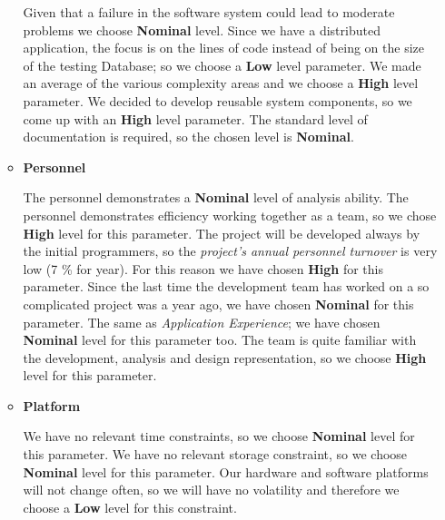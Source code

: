 \begin{itemize}
\begin{itemize}
		\begin{itemize}
			 Given that a failure in the software system could lead to moderate problems we choose \textbf{Nominal} level.
			 Since we have a distributed application, the focus is on the lines of code instead of being on the size of the testing Database; so we choose a \textbf{Low} level parameter.
			 We made an average of the various complexity areas and we choose a \textbf{High} level parameter.
			 We decided to develop reusable system components, so we come up with an \textbf{High} level parameter.
			 The standard level of documentation is required, so the chosen level is \textbf{Nominal}.
		\end{itemize}
		\item \textbf{Personnel}
		\begin{itemize}
			 The personnel demonstrates a \textbf{Nominal} level of analysis ability.
			 The personnel demonstrates efficiency working together as a team, so we chose \textbf{High} level for this parameter.
			 The project will be developed always by the initial programmers, so the \textit{project's annual personnel turnover} is very low (7 \% for year). For this reason we have chosen \textbf{High} for this parameter.
			 Since the last time the development team has worked on a so complicated project was a year ago, we have chosen \textbf{Nominal} for this parameter.
			 The same as \textit{Application Experience}; we have chosen \textbf{Nominal} level for this parameter too.
			 The team is quite familiar with the development, analysis and design representation, so we choose \textbf{High} level for this parameter.
		\end{itemize}
		\item \textbf{Platform}
		\begin{itemize}
			 We have no relevant time constraints, so we choose \textbf{Nominal} level for this parameter.
			 We have no relevant storage constraint, so we choose \textbf{Nominal} level for this parameter. 
			 Our hardware and software platforms will not change often, so we will have no volatility and therefore we choose a \textbf{Low} level for this constraint.

\end{itemize}
\end{itemize}
\end{itemize}
